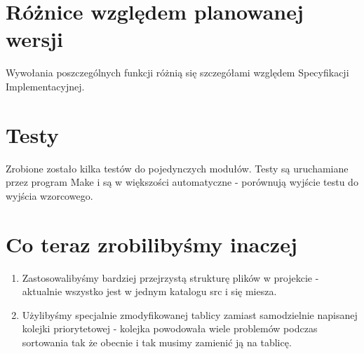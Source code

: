 \documentclass{article}
\begin{document}
\section{Różnice względem planowanej wersji}
    Wywołania poszczególnych funkcji różnią się szczegółami względem Specyfikacji Implementacyjnej.
\section{Testy}
    Zrobione zostało kilka testów do pojedynczych modułów. Testy są uruchamiane przez program Make i są w większości automatyczne - porównują wyjście testu do wyjścia wzorcowego.
\section{Co teraz zrobilibyśmy inaczej}
    \begin{enumerate}
        \item Zastosowalibyśmy bardziej przejrzystą strukturę plików w projekcie - aktualnie wszystko jest w jednym katalogu src i się miesza. 
        \item Użylibyśmy specjalnie zmodyfikowanej tablicy zamiast samodzielnie napisanej kolejki priorytetowej - kolejka powodowała wiele problemów podczas sortowania tak że obecnie i tak musimy zamienić ją na tablicę.
    \end{enumerate}
\end{document}
